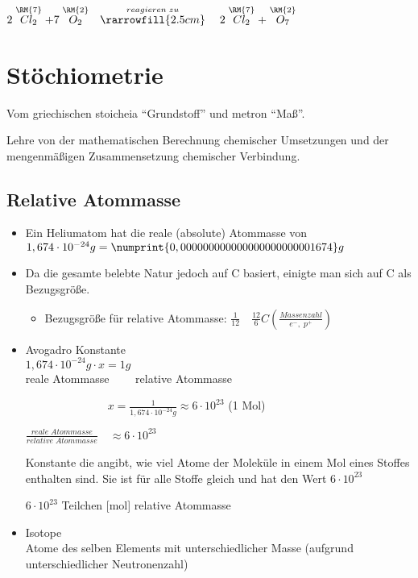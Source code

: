 $2\stackrel{\RM{7}}{Cl_2} + 7\stackrel{\RM{2}}{O_2} \quad\stackrel{reagieren\;zu}{\rarrowfill{2.5cm}}\quad
2\stackrel{\RM{7}}{Cl_2} + \stackrel{\RM{2}}{O_7}$

\section{Stöchiometrie}
Vom griechischen stoicheia \enquote{Grundstoff} und metron \enquote{Maß}.

Lehre von der mathematischen Berechnung chemischer Umsetzungen und der mengenmäßigen Zusammensetzung chemischer Verbindung.
\subsection{Relative Atommasse}
\begin{itemize}
\item Ein Heliumatom hat die reale (absolute) Atommasse von\\ $1,674\cdot 10^{-24}g = \numprint{0,000000000000000000000001674}g$

\item Da die gesamte belebte Natur jedoch auf \acf{C} basiert, einigte man sich auf \acf{C} als Bezugsgröße.
\begin{itemize}
\item Bezugsgröße für relative Atommasse: $\frac{1}{12}\quad\frac{12}{6}C\left(\frac{Massenzahl}{e^{-},\;p^+}\right)$
\end{itemize}
\item Avogadro Konstante\\
$1,674\cdot 10^{-24}g\cdot x = 1g$\\
reale Atommasse$\qquad$ relative Atommasse

$\qquad\qquad\qquad\quad\; x = \frac{1}{1,674\cdot 10^{-24}g}\approx 6\cdot 10^{23}$ (1 Mol)

$\frac{reale\;Atommasse}{relative\;Atommasse} \quad\approx 6\cdot 10^{23}$

Konstante die angibt, wie viel Atome der Moleküle in einem Mol eines Stoffes enthalten sind. Sie ist für alle Stoffe gleich
und hat den Wert $6\cdot 10^{23}$

$6\cdot 10^{23}$ Teilchen  [mol] \entspricht relative Atommasse
\item Isotope\\
Atome des selben Elements mit unterschiedlicher Masse (aufgrund unterschiedlicher Neutronenzahl)
\end{itemize}
